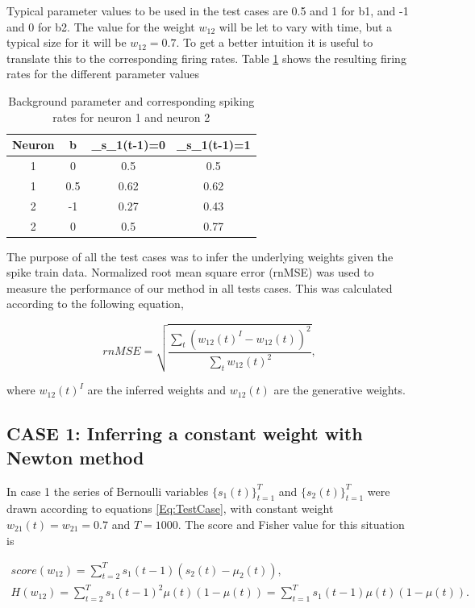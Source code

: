 Typical parameter values to be used in the test cases are 0.5 and 1 for b1, and -1 and 0 for b2. The value for the weight $w_{12}$ will be let to vary with time, but a typical size for it will be $w_{12}=0.7$. To get a better intuition it is useful to translate this to the corresponding firing rates. Table \ref{table:parameters} shows the resulting firing rates for the different parameter values


\begin{table}[!h]
\centering
\begin{tabular}{|c|c|c|c|}
	\hline
	Neuron & b & \mu_{s_{1}(t-1)=0} & \mu_{s_{1}(t-1)=1} \\
	\hline\hline
	1 & 0 & 0.5 & 0.5\\
	\hline
	1 & 0.5 & 0.62 & 0.62\\
	\hline
	2 & -1  & 0.27 & 0.43\\
	\hline
	2 & 0  & 0.5 & 0.77\\
	\hline
\end{tabular}
\caption{Background parameter and corresponding spiking rates for neuron 1 and neuron 2}
\label{table:parameters}
\end{table}

The purpose of all the test cases was to infer the underlying weights given the spike train data. Normalized root mean square error (rnMSE) was used to measure the performance of our method in all tests cases. This was calculated according to the following equation,

\begin{equation}
    rnMSE = \sqrt{\frac{\sum_t(w_{12}(t)^I-w_{12}(t))^2}{\sum_t w_{12}(t)^2}},
\end{equation}

where $w_{12}(t)^I$  are the inferred weights and $w_{12}(t)$ are the generative weights.

\subsection{CASE 1: Inferring a constant weight with Newton method}
\label{sec:CASE1}

In case 1 the series of Bernoulli variables $\{s_{1}(t)\}_{t=1}^T$ and $\{s_{2}(t)\}_{t=1}^T$ were drawn according to equations \ref{Eq:TestCase}, with constant weight $w_{21}(t) = w_{21} = 0.7$ and $T=1000$. The score and Fisher value for this situation is 

\begin{equation}
\begin{split}
    score(w_{12}) = \sum_{t=2}^{T} s_{1}(t-1) (s_{2}(t)-\mu_{2}(t)), \\
    H(w_{12}) = \sum_{t=2}^T s_{1}(t-1)^2 \mu(t)(1-\mu(t)) = \sum_{t=1}^T s_{1}(t-1) \mu(t)(1-\mu(t)).
\end{split}
\end{equation}

